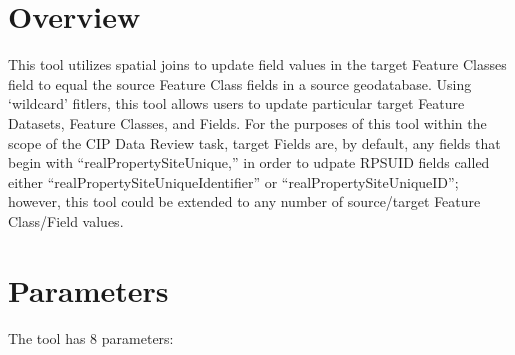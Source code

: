 \documentclass[openany]{book}
\theoremstyle{definition}
\theoremstyle{definition}
\theoremstyle{definition}
\theoremstyle{remark}
\begin{document}
\section{Overview}\label{overview-2}

This tool utilizes spatial joins to update field values in the target
Feature Classes field to equal the source Feature Class fields in a
source geodatabase. Using `wildcard' fitlers, this tool allows users to
update particular target Feature Datasets, Feature Classes, and Fields.
For the purposes of this tool within the scope of the CIP Data Review
task, target Fields are, by default, any fields that begin with
``realPropertySiteUnique,'' in order to udpate RPSUID fields called
either ``realPropertySiteUniqueIdentifier'' or
``realPropertySiteUniqueID''; however, this tool could be extended to
any number of source/target Feature Class/Field values.

\section{Parameters}\label{parameters-2}

The tool has 8 parameters:
\end{document}
